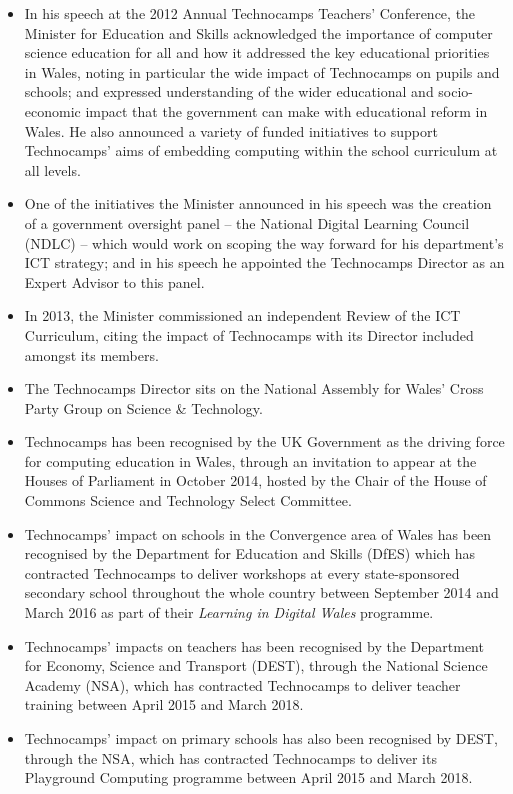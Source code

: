 \documentclass[conference]{IEEEtran}
\begin{document}
\begin{itemize}

\item In his speech at the 2012 Annual Technocamps Teachers'
Conference, %
the Minister for Education and Skills
acknowledged the importance of computer science education for all and
how it addressed the key educational priorities in Wales, noting in particular
the wide impact of Technocamps on pupils and schools; and expressed 
understanding of the wider educational and socio-economic impact that
the government can make with educational reform in Wales. He also
announced a variety of funded initiatives to support Technocamps' aims
of embedding computing within the school curriculum at all levels.

\item One of the initiatives the Minister announced in his speech was
the creation of a government oversight panel -- the National
Digital Learning Council
(NDLC) %
-- which would work on scoping the way forward for his department's
ICT strategy; and in his speech he appointed the
Technocamps Director as an Expert Advisor to this panel.

\item In 2013, the Minister commissioned an independent Review of the ICT
Curriculum, citing the impact of Technocamps with its Director
included amongst its members.

\item The Technocamps Director sits on
the National Assembly for Wales' Cross Party Group on Science \& Technology.

\item Technocamps has been recognised by the UK Government as the driving
force for computing education in Wales, through an invitation to
appear at the Houses of Parliament in October 2014, hosted by the
Chair of the House of Commons Science and Technology Select Committee.

\item Technocamps' impact on schools in the Convergence area
of Wales has been recognised by the Department for Education and Skills (DfES)
which has contracted Technocamps to deliver workshops at every
state-sponsored secondary school throughout the whole country between
September 2014 and March 2016 as part of their \emph{Learning in
Digital Wales} programme.

\item Technocamps' impacts on teachers has been recognised by
the Department for Economy, Science and Transport (DEST), through the
National Science Academy (NSA), which has contracted Technocamps to deliver
teacher training between April 2015 and March 2018.

\item Technocamps' impact on primary schools has also been
recognised by DEST, through the NSA, which has contracted
Technocamps to deliver its Playground Computing programme between
April 2015 and March 2018.

\end{itemize}
\end{document}
